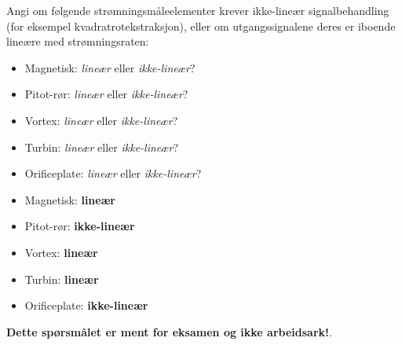 

Angi om følgende strømningsmåleelementer krever ikke-lineær signalbehandling (for eksempel kvadratrotekstraksjon), eller om utgangssignalene deres er iboende lineære med strømningsraten:

\begin{itemize}
\item{} Magnetisk: {\it lineær} eller {\it ikke-lineær}?
\vskip 5pt
\item{} Pitot-rør: {\it lineær} eller {\it ikke-lineær}?
\vskip 5pt
\item{} Vortex: {\it lineær} eller {\it ikke-lineær}? 
\vskip 5pt
\item{} Turbin: {\it lineær} eller {\it ikke-lineær}?
\vskip 5pt
\item{} Orificeplate: {\it lineær} eller {\it ikke-lineær}?
\end{itemize}







\begin{itemize}
\item{} Magnetisk: {\bf lineær}
\vskip 5pt
\item{} Pitot-rør: {\bf ikke-lineær}
\vskip 5pt
\item{} Vortex: {\bf lineær}
\vskip 5pt
\item{} Turbin: {\bf lineær}
\vskip 5pt
\item{} Orificeplate: {\bf ikke-lineær}
\end{itemize}







{\bf Dette spørsmålet er ment for eksamen og ikke arbeidsark!}.


